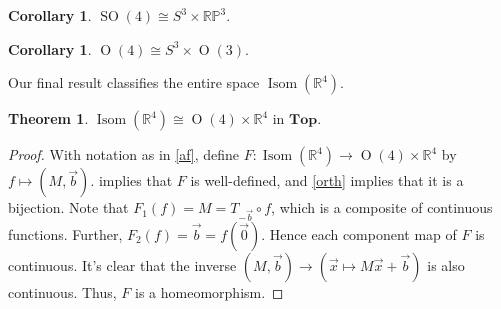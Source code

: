 \documentclass[10pt,letterpaper,cm]{nupset}
\theoremstyle{definition}
\theoremstyle{theorem}
\newtheorem{theorem}[definition]{Theorem}
\newtheorem{cor}[definition]{Corollary}
\theoremstyle{remark}
\newcommand{\RP}{\mathbb {RP}}
\newcommand{\R}{\mathbb R}
\newcommand{\1}{\mathbf{1}}
\renewcommand{\b}{\vec b}
\newcommand{\x}{\vec x}
\newcommand{\0}{\vec {0}}
\DeclareMathOperator{\ORT}{O}
\DeclareMathOperator{\Isom}{Isom}
\DeclareMathOperator{\SO}{SO}
\begin{document}
\smallskip

\begin{cor}
$\SO(4) \cong S^3\times \RP^3$.
\end{cor}

\begin{cor}
$\ORT(4) \cong S^3\times \ORT(3)$.
\end{cor}

\medskip

Our final result  classifies the entire space $\Isom(\R^4)$.

\begin{theorem}
$\Isom(\R^4) \cong \ORT(4)\times \R^4$ in $\mathbf{Top}$. 
\end{theorem}

\begin{proof}
With notation as in \cref{af}, define  $F:\Isom(\R^4)\to \ORT(4)\times \R^4$ by $f\mapsto \left(M, \b\right)$.  implies that $F$ is well-defined, and \cref{orth} implies that it is a bijection. Note that $F_1(f)=M=T_{-\b}\circ f$, which is a composite of continuous functions. Further, $F_2(f)=\b=f(\0)$. Hence each component map of $F$ is continuous. It's clear that the inverse $\left(M,\b\right)\to \left(\x \mapsto M\x +\b\right)$ is also continuous. Thus, $F$ is a homeomorphism.
\end{proof}
\end{document}
